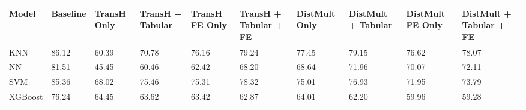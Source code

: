 \begin{tabular}{llllllllll}
\toprule
Model & Baseline & TransH Only & TransH + Tabular & TransH FE Only & TransH + Tabular + FE & DistMult Only & DistMult + Tabular & DistMult FE Only & DistMult + Tabular + FE \\
\midrule
KNN & 86.12 & 60.39 & 70.78 & 76.16 & 79.24 & 77.45 & 79.15 & 76.62 & 78.07 \\
NN & 81.51 & 45.45 & 60.46 & 62.42 & 68.20 & 68.64 & 71.96 & 70.07 & 72.11 \\
SVM & 85.36 & 68.02 & 75.46 & 75.31 & 78.32 & 75.01 & 76.93 & 71.95 & 73.79 \\
XGBoost & 76.24 & 64.45 & 63.62 & 63.42 & 62.87 & 64.01 & 62.20 & 59.96 & 59.28 \\
\bottomrule
\end{tabular}

